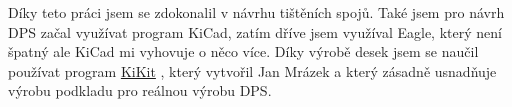 
Díky teto práci jsem se zdokonalil v návrhu tištěních spojů. Také jsem pro návrh DPS začal využívat program KiCad, zatím dříve jsem využíval Eagle, který není špatný ale KiCad 
mi vyhovuje o něco více. Díky výrobě desek jsem se naučil používat program \href{https://github.com/yaqwsx/KiKit}{KiKit} \parencite{KiKit}, 
který vytvořil Jan Mrázek a který zásadně usnadňuje výrobu podkladu pro reálnou výrobu DPS.



